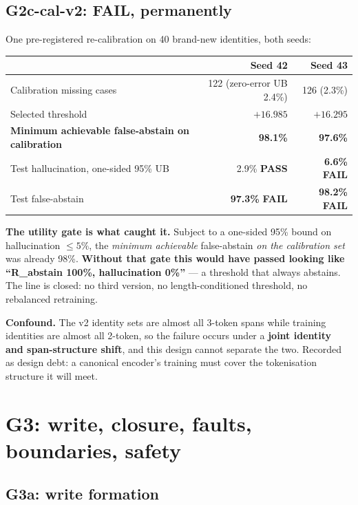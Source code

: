 \documentclass[11pt, a4paper]{article}
\newcommand{\PASS}{\textcolor{green!45!black}{\textbf{PASS}}}
\newcommand{\FAIL}{\textcolor{red!70!black}{\textbf{FAIL}}}
\begin{document}
\subsection{G2c-cal-v2: \FAIL{}, permanently}

One pre-registered re-calibration on 40 brand-new identities, both seeds:

\begin{table}[h]
\centering\small
\begin{tabular}{lrr}
\toprule
& Seed 42 & Seed 43 \\
\midrule
Calibration missing cases & 122 (zero-error UB 2.4\%) & 126 (2.3\%) \\
Selected threshold & $+16.985$ & $+16.295$ \\
\textbf{Minimum achievable false-abstain on calibration} & \textbf{98.1\%} & \textbf{97.6\%} \\
Test hallucination, one-sided 95\% UB & 2.9\% \PASS{} & \textbf{6.6\%} \FAIL{} \\
Test false-abstain & \textbf{97.3\%} \FAIL{} & \textbf{98.2\%} \FAIL{} \\
\bottomrule
\end{tabular}
\end{table}

\textbf{The utility gate is what caught it.} Subject to a one-sided 95\% bound on
hallucination $\le 5\%$, the \emph{minimum achievable} false-abstain \emph{on the
calibration set} was already 98\%. \textbf{Without that gate this would have passed
looking like ``R\_abstain 100\%, hallucination 0\%''} --- a threshold that always
abstains. The line is closed: no third version, no length-conditioned threshold, no
rebalanced retraining.

\textbf{Confound.} The v2 identity sets are almost all 3-token spans while training
identities are almost all 2-token, so the failure occurs under a \textbf{joint identity
and span-structure shift}, and this design cannot separate the two. Recorded as design
debt: a canonical encoder's training must cover the tokenisation structure it will meet.

\section{G3: write, closure, faults, boundaries, safety}

\subsection{G3a: write formation}
\end{document}
